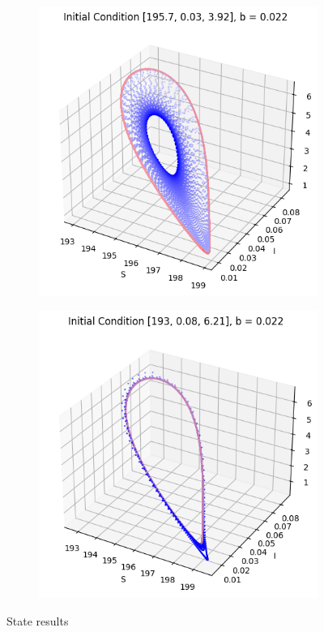 \begin{itemize}
\begin{figure}[H]
\begin{subfigure}[b]{0.3\textwidth}
    \includegraphics[width=\textwidth]{images/task5/ex4_t5_4_2.png}
    \label{fig:subfig_c2}
\end{subfigure}
\begin{subfigure}[b]{0.3\textwidth}
    \centering
    \includegraphics[width=\textwidth]{images/task5/ex4_t5_4_3.png}
    \label{fig:subfig_c3}
\end{subfigure}
\caption{State results}
\label{fig:task5_4_1}
\end{figure}


\end{itemize}
